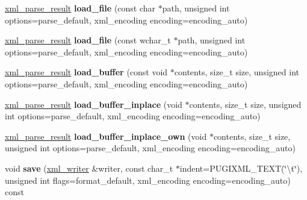 \begin{DoxyCompactItemize}
\item 
\hypertarget{classpugi_1_1xml__document_aad350209a4a91589fbd7e8cdaf79e010}{\hyperlink{structpugi_1_1xml__parse__result}{xml\+\_\+parse\+\_\+result} {\bfseries load\+\_\+file} (const char $\ast$path, unsigned int options=parse\+\_\+default, xml\+\_\+encoding encoding=encoding\+\_\+auto)}\label{classpugi_1_1xml__document_aad350209a4a91589fbd7e8cdaf79e010}

\item 
\hypertarget{classpugi_1_1xml__document_ac5a29d9c9e754120a5e0c072b332a25a}{\hyperlink{structpugi_1_1xml__parse__result}{xml\+\_\+parse\+\_\+result} {\bfseries load\+\_\+file} (const wchar\+\_\+t $\ast$path, unsigned int options=parse\+\_\+default, xml\+\_\+encoding encoding=encoding\+\_\+auto)}\label{classpugi_1_1xml__document_ac5a29d9c9e754120a5e0c072b332a25a}

\item 
\hypertarget{classpugi_1_1xml__document_ab29840790e26b2166a395c63a2b2d9bd}{\hyperlink{structpugi_1_1xml__parse__result}{xml\+\_\+parse\+\_\+result} {\bfseries load\+\_\+buffer} (const void $\ast$contents, size\+\_\+t size, unsigned int options=parse\+\_\+default, xml\+\_\+encoding encoding=encoding\+\_\+auto)}\label{classpugi_1_1xml__document_ab29840790e26b2166a395c63a2b2d9bd}

\item 
\hypertarget{classpugi_1_1xml__document_a3e20650182ccbdd175ca069dd5e08632}{\hyperlink{structpugi_1_1xml__parse__result}{xml\+\_\+parse\+\_\+result} {\bfseries load\+\_\+buffer\+\_\+inplace} (void $\ast$contents, size\+\_\+t size, unsigned int options=parse\+\_\+default, xml\+\_\+encoding encoding=encoding\+\_\+auto)}\label{classpugi_1_1xml__document_a3e20650182ccbdd175ca069dd5e08632}

\item 
\hypertarget{classpugi_1_1xml__document_a9da4bdcdc4ad914fb0f4680b02983502}{\hyperlink{structpugi_1_1xml__parse__result}{xml\+\_\+parse\+\_\+result} {\bfseries load\+\_\+buffer\+\_\+inplace\+\_\+own} (void $\ast$contents, size\+\_\+t size, unsigned int options=parse\+\_\+default, xml\+\_\+encoding encoding=encoding\+\_\+auto)}\label{classpugi_1_1xml__document_a9da4bdcdc4ad914fb0f4680b02983502}

\item 
\hypertarget{classpugi_1_1xml__document_ae69983f0991300cc9afc8891ff9ca4ac}{void {\bfseries save} (\hyperlink{classpugi_1_1xml__writer}{xml\+\_\+writer} \&writer, const char\+\_\+t $\ast$indent=P\+U\+G\+I\+X\+M\+L\+\_\+\+T\+E\+X\+T(\char`\"{}\textbackslash{}t\char`\"{}), unsigned int flags=format\+\_\+default, xml\+\_\+encoding encoding=encoding\+\_\+auto) const }\label{classpugi_1_1xml__document_ae69983f0991300cc9afc8891ff9ca4ac}


\end{DoxyCompactItemize}
